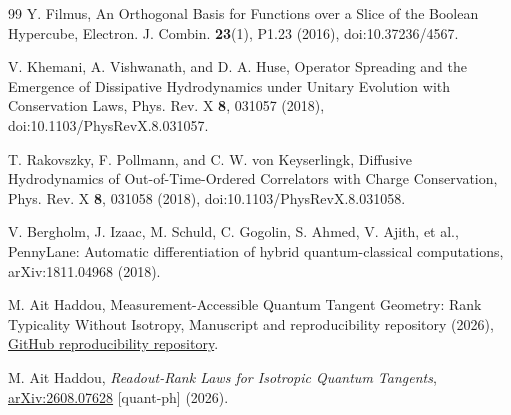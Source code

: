 \documentclass[aps,pra,reprint,superscriptaddress,nofootinbib,longbibliography]{revtex4-2}
\begin{document}
\begin{thebibliography}{99}
Y. Filmus,
An Orthogonal Basis for Functions over a Slice of the Boolean Hypercube,
Electron. J. Combin. \textbf{23}(1), P1.23 (2016),
doi:10.37236/4567.

V. Khemani, A. Vishwanath, and D. A. Huse,
Operator Spreading and the Emergence of Dissipative Hydrodynamics under Unitary Evolution with Conservation Laws,
Phys. Rev. X \textbf{8}, 031057 (2018),
doi:10.1103/PhysRevX.8.031057.

T. Rakovszky, F. Pollmann, and C. W. von Keyserlingk,
Diffusive Hydrodynamics of Out-of-Time-Ordered Correlators with Charge Conservation,
Phys. Rev. X \textbf{8}, 031058 (2018),
doi:10.1103/PhysRevX.8.031058.



V. Bergholm, J. Izaac, M. Schuld, C. Gogolin, S. Ahmed, V. Ajith, et al.,
PennyLane: Automatic differentiation of hybrid quantum-classical computations,
arXiv:1811.04968 (2018).



M. Ait Haddou,
Measurement-Accessible Quantum Tangent Geometry: Rank Typicality Without Isotropy,
Manuscript and reproducibility repository (2026),
\href{https://github.com/AHDMarwan/Spectral-Geometry-of-Accessible-Quantum-Tangents-Beyond-Isotropic-Readout-Rank-Laws}{GitHub reproducibility repository}.



M. Ait Haddou,
\textit{Readout-Rank Laws for Isotropic Quantum Tangents},
\href{https://arxiv.org/abs/2608.07628}{arXiv:2608.07628} [quant-ph] (2026).

\end{thebibliography}

\end{document}
